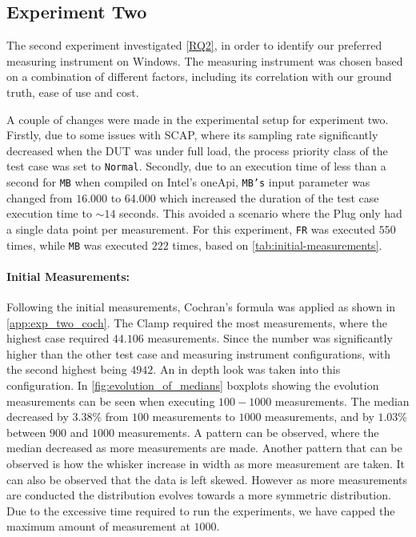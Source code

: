 \subsection{Experiment Two}\label{subsec:exp_two}

The second experiment investigated \cref{RQ2}, in order to identify our preferred measuring instrument on Windows. The measuring instrument was chosen based on a combination of different factors, including its correlation with our ground truth, ease of use and cost. 

A couple of changes were made in the experimental setup for experiment two. Firstly, due to some issues with SCAP, where its sampling rate significantly decreased when the DUT was under full load, the process priority class of the test case was set to \texttt{Normal}. Secondly, due to an execution time of less than a second for \texttt{MB} when compiled on Intel's oneApi, \texttt{MB's} input parameter was changed from $16.000$ to $64.000$ which increased the duration of the test case execution time to $\sim 14$ seconds. This avoided a scenario where the Plug only had a single data point per measurement. For this experiment, \texttt{FR} was executed $550$ times, while \texttt{MB} was executed $222$ times, based on \cref{tab:initial-measurements}.

\paragraph{Initial Measurements:} Following the initial measurements, Cochran's formula was applied as shown in \cref{app:exp_two_coch}. %
The Clamp required the most measurements, where the highest case required $44.106$ measurements. Since the number was significantly higher than the other test case and measuring instrument configurations, with the second highest being $4942$. An in depth look was taken into this configuration. In \cref{fig:evolution_of_medians} boxplots showing the evolution measurements can be seen when executing $100-1000$ measurements. The median decreased by $3.38\%$ from $100$ measurements to $1000$ measurements, and by $1.03\%$ between $900$ and $1000$ measurements. A pattern can be observed, where the median decreased as more measurements are made. Another pattern that can be observed is how the whisker increase in width as more measurement are taken. It can also be observed that the data is left skewed. However as more measurements are conducted the distribution evolves towards a more symmetric distribution. Due to the excessive time required to run the experiments, we have capped the maximum amount of measurement at $1000$.

